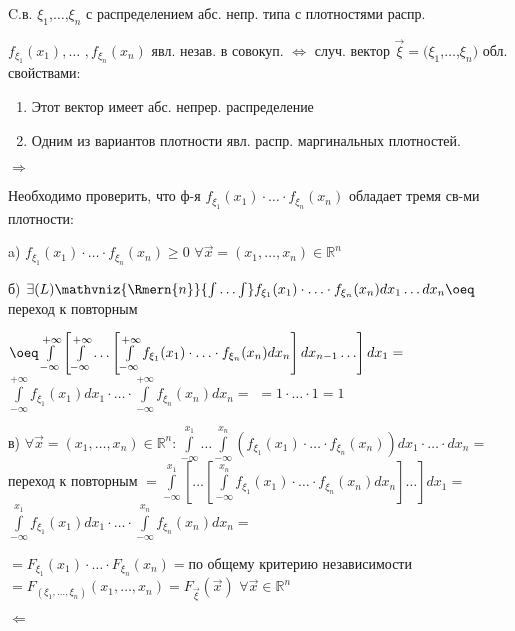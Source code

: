 \begin{proofs}
	C.в. $\xi_1$,$\dots$,$\xi_n$ с распределением абс. непр. типа с плотностями распр. 
	
	$f_{\xi_1}(x_1),\ldots$ $,f_{\xi_n}(x_n)$ явл. незав. в совокуп. $\iff$ случ. вектор
	$\overrightarrow{\xi} = (\xi_1$,$\dots$,$\xi_n)$ обл. свойствами:
	\begin{enumerate}
		\item Этот вектор имеет абс. непрер. распределение
		\item Одним из вариантов плотности явл. распр. маргинальных плотностей.
	\end{enumerate}
	\begin{dokvo}
	
		$\Rightarrow$ 
		
		Необходимо проверить, что ф-я $f_{\xi_1}(x_1)\cdot \ldots \cdot f_{\xi_n}(x_n)$
		обладает тремя св-ми плотности:
		
		a) $f_{\xi_1}(x_1)\cdot \ldots \cdot f_{\xi_n}(x_n) \geq 0$ $\forall \overrightarrow{x} = (x_1, \ldots, x_n) \in \mathbb{R}^n$
		
		б) $\exists (L) \mathvniz{\Rmern{n}}{\int\ldots\int}f_{\xi_1}(x_1)\cdot \ldots \cdot f_{\xi_n}(x_n)d x_1 \ldots d x_n \oeq$ переход к повторным
		
		$\oeq \int\limits_{-\infty}^{+\infty} \left[ \int\limits_{-\infty}^{+\infty} \ldots \left[ \int\limits_{-\infty}^{+\infty}f_{\xi_1}(x_1)\cdot \ldots \cdot f_{\xi_n}(x_n) dx_n \right] dx_{n-1} \ldots \right] dx_1 =$
		$\int\limits_{-\infty}^{+\infty} f_{\xi_1}(x_1)dx_1 \cdot \ldots \cdot \int\limits_{-\infty}^{+\infty} f_{\xi_n}(x_n)dx_n =$
		$= 1 \cdot \ldots \cdot 1 = 1$
		
		в) $\forall \overrightarrow{x} = (x_1, \ldots, x_n) \in \mathbb{R}^n : \int\limits_{-\infty}^{x_1} \ldots \int\limits_{-\infty}^{x_n}(f_{\xi_1}(x_1)\cdot \ldots \cdot f_{\xi_n}(x_n))dx_1 \cdot \ldots \cdot dx_n =$ переход к повторным
		$= \int\limits_{-\infty}^{x_1} \left[\ldots \left[ \int\limits_{-\infty}^{x_n}f_{\xi_1}(x_1)\cdot \ldots \cdot f_{\xi_n}(x_n) dx_n \right] \ldots \right] dx_1 = $
		$\int\limits_{-\infty}^{x_1} f_{\xi_1}(x_1)dx_1 \cdot \ldots \cdot \int\limits_{-\infty}^{x_n} f_{\xi_n}(x_n)dx_n =$
		
		$=F_{\xi_1}(x_1)\cdot \ldots \cdot F_{\xi_n}(x_n)=$по общему критерию независимости $= F_{(\xi_1, \ldots, \xi_n)}(x_1, \ldots, x_n) = F_{\overrightarrow{\xi}}(\overrightarrow{x})$
		$\forall \overrightarrow{x} \in \mathbb{R}^n$ 
		
		$\Leftarrow$
		

\end{dokvo}
\end{proofs}
